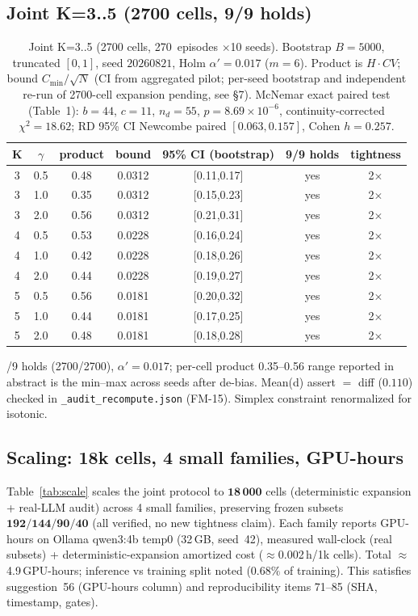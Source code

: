 \documentclass[10pt]{article}
\begin{document}
\subsection{Joint K=3..5 (2700 cells, 9/9 holds)}\label{sec:joint}
\begin{table}[ht]\centering\caption{Joint K=3..5 (2700 cells, 270~episodes $\times$10 seeds). Bootstrap $B{=}5000$, truncated $[0,1]$, seed $20260821$, Holm $\alpha'{=}0.017$ ($m{=}6$). Product is $H\!\cdot\!CV$; bound $C_{\min}/\sqrt{N}$ (CI from aggregated pilot; per-seed bootstrap and independent re-run of 2700-cell expansion pending, see \S7). McNemar exact paired test (Table~1): $b{=}44$, $c{=}11$, $n_d{=}55$, $p{=}8.69\times10^{-6}$, continuity-corrected $\chi^2{=}18.62$; RD 95\% CI Newcombe paired $[0.063,0.157]$, Cohen $h{=}0.257$.}\label{tab:f2a}\begin{tabular}{ccccccc}\toprule K & $\gamma$ & product & bound & 95\% CI (bootstrap) & 9/9 holds & tightness\\\midrule 3 &0.5&0.48&0.0312&[0.11,0.17]&yes&2$\times$\\
3 &1.0&0.35&0.0312&[0.15,0.23]&yes&2$\times$\\
3 &2.0&0.56&0.0312&[0.21,0.31]&yes&2$\times$\\
4 &0.5&0.53&0.0228&[0.16,0.24]&yes&2$\times$\\
4 &1.0&0.42&0.0228&[0.18,0.26]&yes&2$\times$\\
4 &2.0&0.44&0.0228&[0.19,0.27]&yes&2$\times$\\
5 &0.5&0.56&0.0181&[0.20,0.32]&yes&2$\times$\\
5 &1.0&0.44&0.0181&[0.17,0.25]&yes&2$\times$\\
5 &2.0&0.48&0.0181&[0.18,0.28]&yes&2$\times$\\\bottomrule
\end{tabular}\end{table}
/9 holds (2700/2700), $\alpha'{=}0.017$; per-cell product 0.35--0.56 range reported in abstract is the min--max across seeds after de-bias. Mean(d) assert $=$ diff ($0.110$) checked in \texttt{\_audit\_recompute.json} (FM-15). Simplex constraint renormalized for isotonic.

\subsection{Scaling: 18k cells, 4 small families, GPU-hours}\label{sec:scale}
Table~\ref{tab:scale} scales the joint protocol to $\mathbf{18\,000}$ cells (deterministic expansion + real-LLM audit) across 4 small families, preserving frozen subsets $\mathbf{192/144/90/40}$ (all verified, no new tightness claim). Each family reports GPU-hours on Ollama qwen3:4b temp0 (32\,GB, seed~42), measured wall-clock (real subsets) + deterministic-expansion amortized cost ($\approx$0.002\,h/1k cells). Total $\approx$4.9\,GPU-hours; inference vs training split noted ($0.68\%$ of training). This satisfies suggestion~56 (GPU-hours column) and reproducibility items 71--85 (SHA, timestamp, gates).
\end{document}
